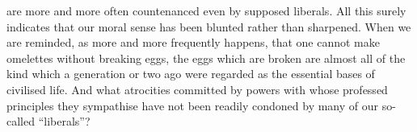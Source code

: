 \documentclass[11pt,openany]{book}
\begin{document}
are more and more often countenanced even by supposed liberals. All this surely indicates that our moral sense has been blunted rather than sharpened. When we are reminded, as more and more frequently happens, that one cannot make omelettes without breaking eggs, the eggs which are broken are almost all of the kind which a generation or two ago were regarded as the essential bases of civilised life. And what atrocities committed by powers with whose professed principles they sympathise have not been readily condoned by many of our so-called ``liberals''?

\begin{center}\textasteriskcentered\hspace{0.9em}\textasteriskcentered\hspace{0.9em}\textasteriskcentered\end{center}

\begin{center}\textasteriskcentered\hspace{0.9em}\textasteriskcentered\hspace{0.9em}\textasteriskcentered\end{center}

\begin{center}\textasteriskcentered\hspace{0.9em}\textasteriskcentered\hspace{0.9em}\textasteriskcentered\end{center}

\begin{center}\textasteriskcentered\hspace{0.9em}\textasteriskcentered\hspace{0.9em}\textasteriskcentered\end{center}

\begin{center}\textasteriskcentered\hspace{0.9em}\textasteriskcentered\hspace{0.9em}\textasteriskcentered\end{center}
\end{document}
